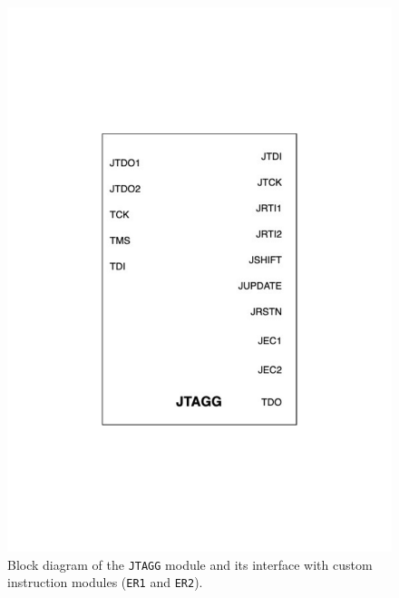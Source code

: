\documentclass[a4paper,11pt,oneside]{report}
\begin{document}
\begin{figure}[H]
    \centering
    \includegraphics[width=0.9\linewidth]{figures/jtagg_block_diagram.pdf}
    \caption{Block diagram of the \texttt{JTAGG} module and its interface with custom instruction modules (\texttt{ER1} and \texttt{ER2}).}
    \label{fig:jtagg_block}
\end{figure}
\end{document}
